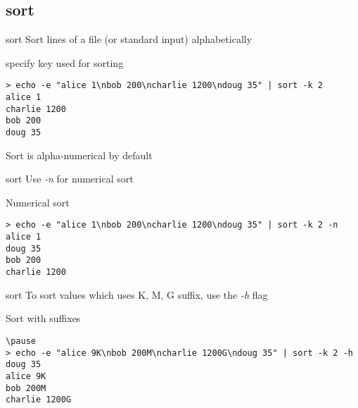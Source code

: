 \subsection{sort}

\begin{frame}[fragile]{sort}
Sort lines of a file (or standard input) alphabetically
  \pause
  \begin{exampleblock}{specify key used for sorting}
    \begin{lstlisting}[showstringspaces=false,basicstyle=\tiny]
> echo -e "alice 1\nbob 200\ncharlie 1200\ndoug 35" | sort -k 2
alice 1
charlie 1200
bob 200
doug 35
    \end{lstlisting}
  \end{exampleblock}
\pause
Sort is alpha-numerical by default
\end{frame}

\begin{frame}[fragile]{sort}
Use \emph{-n} for numerical sort
  \pause
  \begin{exampleblock}{Numerical sort}
    \begin{lstlisting}[showstringspaces=false,basicstyle=\tiny]
> echo -e "alice 1\nbob 200\ncharlie 1200\ndoug 35" | sort -k 2 -n
alice 1
doug 35
bob 200
charlie 1200
    \end{lstlisting}
  \end{exampleblock}
\end{frame}


\begin{frame}[fragile]{sort}
To sort values which uses K, M, G suffix, use the \emph{-h} flag
\pause
  \begin{exampleblock}{Sort with suffixes}
    \begin{lstlisting}[showstringspaces=false,basicstyle=\tiny]
\pause
> echo -e "alice 9K\nbob 200M\ncharlie 1200G\ndoug 35" | sort -k 2 -h
doug 35
alice 9K
bob 200M
charlie 1200G
    \end{lstlisting}
  \end{exampleblock}
\end{frame}
